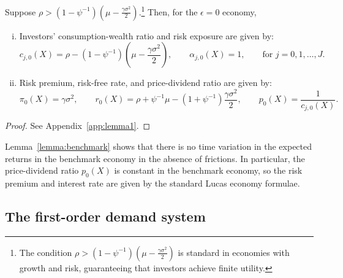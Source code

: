 \begin{lemma}\label{lemma:benchmark}
Suppose $\rho>\left(1-\psi^{-1}\right)\left( \mu - \frac{\gamma
\sigma^2}{2}  \right)$.\footnote{The condition $\rho>\left(1-\psi^{-1}\right)\left( \mu - \frac{\gamma
\sigma^2}{2}  \right)$ is standard in economies with growth and risk, guaranteeing that investors achieve finite utility.} Then, for the $\epsilon=0$ economy, 
\begin{enumerate}[(i)]
\item Investors' consumption-wealth ratio and risk exposure are given by:
\begin{equation}
 c_{j,0}(X) = \rho - \left(1-\psi^{-1}\right) \left( \mu - \frac{\gamma \sigma^2}{2} \right), \qquad \alpha_{j,0}(X) = 1, \qquad \text{for } j = 0,1,\ldots, J.\nonumber
\end{equation}

\item Risk premium, risk-free rate, and price-dividend ratio are given by:
\begin{equation}\nonumber
    \pi_0 (X) = \gamma \sigma^2, \qquad 
    r_0(X) = \rho + \psi^{-1} \mu - \left (1+\psi^{-1}\right ) \frac{\gamma \sigma^2}{2}, \qquad 
    p_0(X) =  \frac{1}{c_{j,0}(X)}.
\end{equation}
\end{enumerate}
\end{lemma}
\begin{proof}
See Appendix~\ref{app:lemma1}.
\end{proof}

Lemma~\ref{lemma:benchmark} shows that there is no time variation in the expected returns in the benchmark economy in the absence of frictions. 
In particular, the price-dividend ratio $p_0(X)$ is constant in the benchmark economy, so the risk premium and interest rate are given by the standard Lucas economy formulae.

\subsection{The first-order demand system}

